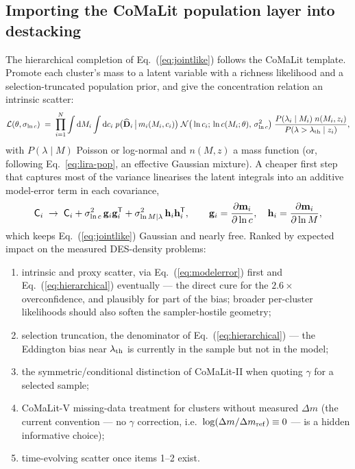 \documentclass[11pt,a4paper]{article}
\newcommand{\dd}{\mathrm{d}}
\begin{document}
\subsection{Importing the CoMaLit population layer into destacking}

The hierarchical completion of Eq.~(\ref{eq:jointlike}) follows the
CoMaLit template. Promote each cluster's mass to a latent variable with a
richness likelihood and a selection-truncated population prior, and give
the concentration relation an intrinsic scatter:
\begin{equation}
\mathcal{L}(\theta, \sigma_{\ln c}) \;=\;
\prod_{i=1}^{N} \int \dd M_i \int \dd c_i \;
p\big(\widehat{\mathbf{D}}_i \,\big|\, m_i(M_i, c_i)\big)\;
\mathcal{N}\big(\ln c_i;\, \ln c(M_i; \theta),\, \sigma_{\ln c}^2\big)\;
\frac{P(\lambda_i \mid M_i)\; n(M_i, z_i)}
{P(\lambda > \lambda_{\rm th} \mid z_i)},
\label{eq:hierarchical}
\end{equation}
with $P(\lambda \mid M)$ Poisson or log-normal and $n(M, z)$ a mass
function (or, following Eq.~\ref{eq:lira-pop}, an effective Gaussian
mixture). A cheaper first step that captures most of the variance
linearises the latent integrals into an additive model-error term in each
covariance,
\begin{equation}
\mathsf{C}_i \;\rightarrow\;
\mathsf{C}_i
+ \sigma_{\ln c}^2\, \mathbf{g}_i \mathbf{g}_i^{\sf T}
+ \sigma_{\ln M|\lambda}^2\, \mathbf{h}_i \mathbf{h}_i^{\sf T},
\qquad
\mathbf{g}_i = \frac{\partial \mathbf{m}_i}{\partial \ln c},\quad
\mathbf{h}_i = \frac{\partial \mathbf{m}_i}{\partial \ln M},
\label{eq:modelerror}
\end{equation}
which keeps Eq.~(\ref{eq:jointlike}) Gaussian and nearly free. Ranked by
expected impact on the measured DES-density problems:
\begin{enumerate}
\item intrinsic and proxy scatter, via Eq.~(\ref{eq:modelerror}) first and
Eq.~(\ref{eq:hierarchical}) eventually --- the direct cure for the
$2.6\times$ overconfidence, and plausibly for part of the bias; broader
per-cluster likelihoods should also soften the sampler-hostile geometry;
\item selection truncation, the denominator of Eq.~(\ref{eq:hierarchical})
--- the Eddington bias near $\lambda_{\rm th}$ is currently in the sample
but not in the model;
\item the symmetric/conditional distinction of CoMaLit-II when quoting
$\gamma$ for a selected sample;
\item CoMaLit-V missing-data treatment for clusters without measured
$\Delta m$ (the current convention --- no $\gamma$ correction, i.e.\
$\log(\Delta m/\Delta m_{\rm ref}) \equiv 0$ --- is a hidden informative
choice);
\item time-evolving scatter once items 1--2 exist.
\end{enumerate}
\end{document}
